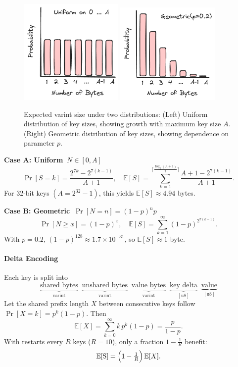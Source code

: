 \documentclass[10pt]{article}
\begin{document}
\begin{figure}[htbp]
    \centering
    \includegraphics[width=0.45\textwidth]{uniform.png}
    \includegraphics[width=0.45\textwidth]{geometric.png}
    \caption{Expected varint size under two distributions: (Left) Uniform distribution of key sizes, showing growth with maximum key size \(A\). (Right) Geometric distribution of key sizes, showing dependence on parameter \(p\).}
    \label{fig:varint_combined}
\end{figure}


\textbf{Case A: Uniform \(\,N\in[0,A]\)}  
\[
\Pr[S = k]
= \frac{2^{7k} - 2^{7(k-1)}}{A+1}, 
\quad
\mathbb{E}[S]
= \sum_{k=1}^{\lceil\frac{\log_2(A+1)}{7}\rceil}
  \frac{A+1 - 2^{7(k-1)}}{A+1}.
\]
For 32-bit keys \((A=2^{32}-1)\), this yields \(\mathbb{E}[S]\approx4.94\) bytes.

\textbf{Case B: Geometric \(\, \Pr[N=n]=(1-p)^n p\)}  
\[
\Pr[N\ge x] = (1-p)^x,\quad
\mathbb{E}[S] = \sum_{k=1}^\infty (1-p)^{2^{7(k-1)}}.
\]
With \(p=0.2\), \((1-p)^{128}\approx1.7\times10^{-31}\), so \(\mathbb{E}[S]\approx1\) byte.

\paragraph{Delta Encoding}  
Each key is split into
\[
\underbrace{\text{shared\_bytes}}_{\text{varint}}
\;\;
\underbrace{\text{unshared\_bytes}}_{\text{varint}}
\;\;
\underbrace{\text{value\_bytes}}_{\text{varint}}
\;\;
\underbrace{\text{key\_delta}}_{[\text{u8}]}
\;\;
\underbrace{\text{value}}_{[\text{u8}]}
\]
Let the shared prefix length \(X\) between consecutive keys follow
\(\Pr[X=k]=p^k(1-p)\).  Then
\[
\mathbb{E}[X] = \sum_{k=0}^\infty k\,p^k(1-p) = \frac{p}{1-p}.
\]
With restarts every \(R\) keys (\(R=10\)), only a fraction \(1-\tfrac1R\) benefit:
\[
\mathbb{E}[\text{S}] = \Bigl(1 - \tfrac1R\Bigr)\,\mathbb{E}[X].
\]
\end{document}
